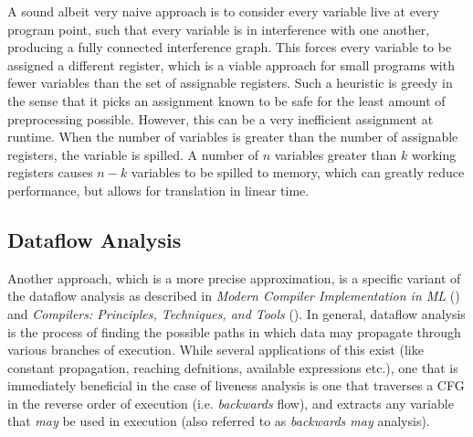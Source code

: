 \documentclass{article}
\begin{document}

A sound albeit very naive approach is to consider every variable live at every program point, such that every variable is in interference with one another, producing a fully connected interference graph.
This forces every variable to be assigned a different register, which is a viable approach for small programs with fewer variables than the set of assignable registers.
Such a heuristic is greedy in the sense that it picks an assignment known to be safe for the least amount of preprocessing possible. However, this can be a very inefficient assignment at runtime. 
When the number of variables is greater than the number of assignable registers, the variable is spilled. A number of \(n\)  variables greater than \(k\) working registers causes \(n-k\) variables to be spilled to memory, %
which can greatly reduce performance, but  allows for translation in linear time. %

\subsection{Dataflow Analysis}


Another approach, which is a more precise approximation, is a specific variant of the dataflow analysis as described in \textit{Modern Compiler Implementation in ML} (\cite{tiger}) and \textit{Compilers: Principles, Techniques, and Tools} (\cite{dragon}). In general, dataflow analysis is the process of finding the possible paths in which data may propagate through various branches of execution.  While several applications of this exist (like constant propagation, reaching defnitions, available expressions etc.), one that is immediately beneficial in the case of liveness analysis is one that traverses a CFG in the reverse order of execution (i.e.  \textit{backwards} flow), and extracts any variable that \textit{may} be used in execution (also referred to as \textit{backwards may} analysis). %
\end{document}
